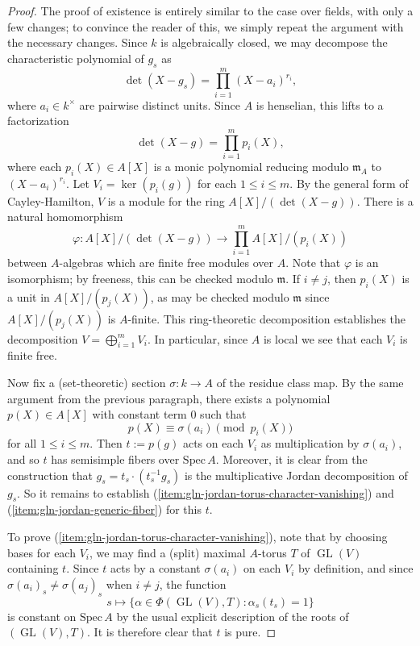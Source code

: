 \documentclass[11pt,reqno]{amsart}
\theoremstyle{definition}
\newcommand{\Spec}{\mathrm{Spec} \,}
\newcommand{\vp}{\varphi}
\newcommand{\fm}{\mathfrak{m}}
\DeclareMathOperator{\GL}{GL}
\begin{document}
\begin{proof}
The proof of existence is entirely similar to the case over fields, with only a few changes; to convince the reader of this, we simply repeat the argument with the necessary changes. Since $k$ is algebraically closed, we may decompose the characteristic polynomial of $g_s$ as
\[
\det(X - g_s) = \prod_{i=1}^{m} (X - a_i)^{r_i},
\]
where $a_i \in k^\times$ are pairwise distinct units. Since $A$ is henselian, this lifts to a factorization
\[
\det(X - g) = \prod_{i=1}^{m} p_i(X),
\]
where each $p_i(X) \in A[X]$ is a monic polynomial reducing modulo $\fm_A$ to $(X - a_i)^{r_i}$. Let $V_i = \ker(p_i(g))$ for each $1 \leq i \leq m$. By the general form of Cayley-Hamilton, $V$ is a module for the ring $A[X]/(\det(X - g))$. There is a natural homomorphism 
\[
\vp: A[X]/(\det(X - g)) \to \prod_{i=1}^m A[X]/(p_i(X))
\]
between $A$-algebras which are finite free modules over $A$. Note that $\vp$ is an isomorphism; by freeness, this can be checked modulo $\fm$. If $i \neq j$, then $p_i(X)$ is a unit in $A[X]/(p_j(X))$, as may be checked modulo $\fm$ since $A[X]/(p_j(X))$ is $A$-finite. This ring-theoretic decomposition establishes the decomposition $V = \bigoplus_{i=1}^m V_i$. In particular, since $A$ is local we see that each $V_i$ is finite free. \smallskip

Now fix a (set-theoretic) section $\sigma: k \to A$ of the residue class map. By the same argument from the previous paragraph, there exists a polynomial $p(X) \in A[X]$ with constant term $0$ such that
\[
p(X) \equiv \sigma(a_i) \pmod{p_i(X)}
\]
for all $1 \leq i \leq m$. Then $t := p(g)$ acts on each $V_i$ as multiplication by $\sigma(a_i)$, and so $t$ has semisimple fibers over $\Spec A$. Moreover, it is clear from the construction that $g_s = t_s \cdot (t_s^{-1}g_s)$ is the multiplicative Jordan decomposition of $g_s$. So it remains to establish (\ref{item:gln-jordan-torus-character-vanishing}) and (\ref{item:gln-jordan-generic-fiber}) for this $t$. \smallskip

To prove (\ref{item:gln-jordan-torus-character-vanishing}), note that by choosing bases for each $V_i$, we may find a (split) maximal $A$-torus $T$ of $\GL(V)$ containing $t$. Since $t$ acts by a constant $\sigma(a_i)$ on each $V_i$ by definition, and since $\sigma(a_i)_s \neq \sigma(a_j)_s$ when $i \neq j$, the function
\[
s \mapsto \{\alpha \in \Phi(\GL(V), T): \alpha_s(t_s) = 1\}
\]
is constant on $\Spec A$ by the usual explicit description of the roots of $(\GL(V), T)$. It is therefore clear that $t$ is pure. \smallskip


\end{proof}
\end{document}
